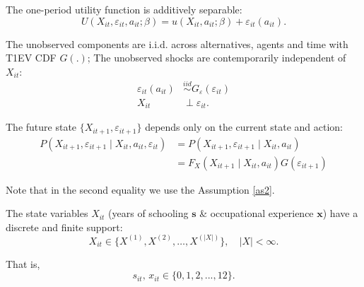 \documentclass[a4paper, 12pt]{article}
\begin{document}
\begin{assumption}
The one-period utility function is additively separable:
\begin{equation}
   U( X_{it},\varepsilon_{it}, a_{it}; \beta) = u(X_{it}, a_{it}; \beta) + \varepsilon_{it}(a_{it}).
\end{equation}
\label{as1}
\end{assumption}

\begin{assumption}
The unobserved components are i.i.d. across alternatives, agents and time with T1EV CDF \( G(.) \); The unobserved shocks are contemporarily independent of \( X_{it} \):
\begin{equation}
\begin{split}
 \varepsilon_{it}(a_{it}) &\overset{\textit{iid}}{\sim}  G_{\varepsilon}(\varepsilon_{it})\\
X_{it} &\perp \varepsilon_{it}. 
\end{split}
\end{equation}
\label{as2}
\end{assumption}


\begin{assumption}
The future state \( \{ X_{it+1}, \varepsilon_{it+1} \}\) depends only on the current state and action:
\begin{equation}
\begin{split}
   P(X_{it+1}, \varepsilon_{it+1} \mid X_{it}, a_{it}, \varepsilon_{it}) &= P(X_{it+1}, \varepsilon_{it+1} \mid X_{it}, a_{it}) \\&=F_X(X_{it+1} \mid X_{it}, a_{it})G(\varepsilon_{it+1}) 
\end{split}
\end{equation}
\label{as3}
\end{assumption}

Note that in the second equality we use the Assumption \eqref{as2}.

\begin{assumption}
The state variables \( X_{it} \) (years of schooling $\boldsymbol{s}$ \& occupational experience $\boldsymbol{x}$) have a discrete and finite support:
\begin{equation}
    X_{it} \in \{X^{(1)}, X^{(2)}, \dots, X^{(|X|)}\}, \quad |X| < \infty.  
\end{equation}
\label{as4}

That is, 
\begin{equation}
s_{it},\, x_{it}\in\{0,1,2,...,12\}.
\end{equation}
\end{assumption}

\clearpage


\end{document}
